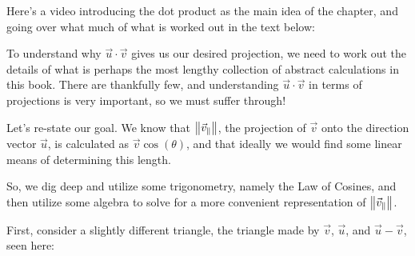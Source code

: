 \documentclass{ximera}
\begin{document}
     Here's a video introducing the dot product as the main idea of the chapter, and going over what much of what is worked out in the text below:


     To understand why $\vec{u}\cdot\vec{v}$ gives us our desired projection, we need to work out the details of what is perhaps the most lengthy collection of abstract calculations in this book. There are thankfully few, and understanding $\vec{u}\cdot\vec{v}$ in terms of projections is very important, so we must suffer through!

     \begin{explanation}
      Let's re-state our goal. We know that $\left\|\vec{v}_\parallel\right\|$, the projection of $\vec{v}$ onto the direction vector $\vec{u}$, is calculated as $\vec{v}\cos(\theta)$, and that ideally we would find some linear means of determining this length. 

      So, we dig deep and utilize some trigonometry, namely the Law of Cosines, and then utilize some algebra to solve for a more convenient representation of $\left\|\vec{v}_\parallel\right\|$.

      First, consider a slightly different triangle, the triangle made by $\vec{v}$, $\vec{u}$, and $\vec{u}-\vec{v}$, seen here:

      \begin{center}
\end{center}
\end{explanation}
\end{document}

